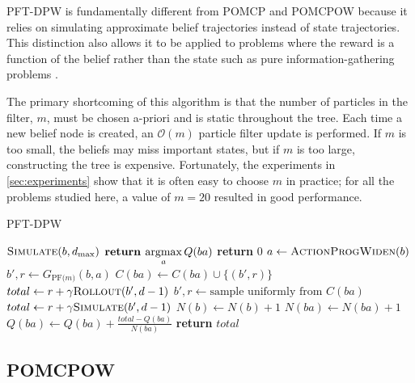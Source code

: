 PFT-DPW is fundamentally different from POMCP and POMCPOW because it relies on simulating approximate belief trajectories instead of state trajectories.
This distinction also allows it to be applied to problems where the reward is a function of the belief rather than the state such as pure information-gathering problems \cite{dressel2017efficient,araya2010pomdp}.

The primary shortcoming of this algorithm is that the number of particles in the filter, $m$, must be chosen a-priori and is static throughout the tree.
Each time a new belief node is created, an $\mathcal{O}(m)$ particle filter update is performed.
If $m$ is too small, the beliefs may miss important states, but if $m$ is too large, constructing the tree is expensive.
Fortunately, the experiments in \cref{sec:experiments} show that it is often easy to choose $m$ in practice; for all the problems studied here, a value of $m=20$ resulted in good performance.


\begin{algorithm}[htbp]
    \caption{PFT-DPW} \label{alg:pft}
    \begin{algorithmic}[1]
                \State $\Call{Simulate}{b, d_\text{max}}$
            \EndFor
            \State $\textbf{return } \underset{a}{\argmax}\, Q(ba)$
        \EndProcedure
                \State \textbf{return} $0$
            \EndIf
            \State $a \gets \Call{ActionProgWiden}{b}$
                \State $b',r \gets G_\text{PF($m$)}(b,a)$
                \State $C(ba) \gets C(ba) \cup \{(b',r)\}$
                \State $total \gets r + \gamma \Call{Rollout}{b', d-1}$
            \Else
                \State $b', r \gets \text{sample uniformly from } C(ba)$
                \State $total \gets r + \gamma \Call{Simulate}{b', d-1}$
            \EndIf
            \State $N(b) \gets N(b)+1$
            \State $N(ba) \gets N(ba)+1$
            \State $Q(ba) \gets Q(ba) + \frac{total - Q(ba)}{N(ba)}$
            \State \textbf{return} $total$
        \EndProcedure
    \end{algorithmic}
\end{algorithm}

\subsection{POMCPOW} \label{sec:pomcpow}

